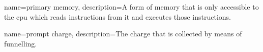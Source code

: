 {
        name=primary memory,
        description={A form of memory that is only accessible to the \acrlong{cpu} which reads instructions from it and executes those instructions.}
}

{
        name=prompt charge,
        description={The charge that is collected by means of funnelling.} %
}
